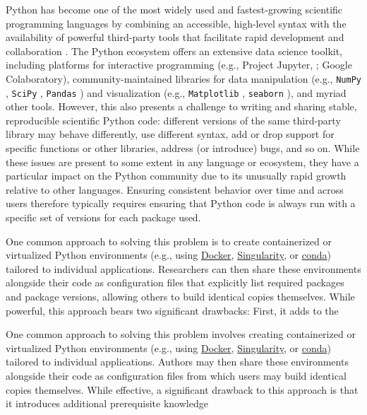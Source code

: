 \documentclass[preprint,12pt, a4paper]{elsarticle}
\begin{document}
Python has become one of the most widely used and fastest-growing scientific programming languages by combining an accessible, high-level syntax with the availability of powerful third-party tools that facilitate rapid development and collaboration \cite{MullEtal15}. The Python ecosystem offers an extensive data science toolkit, including platforms for interactive programming (e.g., Project Jupyter, \cite{KluyEtal16}; Google Colaboratory), community-maintained libraries for data manipulation (e.g., \texttt{NumPy} \cite{HarrEtal20}, \texttt{SciPy} \cite{VirtEtal20}, \texttt{Pandas} \cite{McKi10}) and visualization (e.g., \texttt{Matplotlib} \cite{Hunt07}, \texttt{seaborn} \cite{Wask21}), and myriad other tools. However, this also presents a challenge to writing and sharing stable, reproducible scientific Python code: different versions of the same third-party library may behave differently, use different syntax, add or drop support for specific functions or other libraries, address (or introduce) bugs, and so on. While these issues are present to some extent in any language or ecosystem, they have a particular impact on the Python community due to its unusually rapid growth relative to other languages. Ensuring consistent behavior over time and across users therefore typically requires ensuring that Python code is always run with a specific set of versions for each package used. 

One common approach to solving this problem is to create containerized or virtualized Python environments (e.g., using \href{https://www.docker.com/}{Docker}, \href{https://sylabs.io/singularity/}{Singularity}, or \href{https://docs.conda.io/en/latest/}{conda}) tailored to individual applications. Researchers can then share these environments alongside their code as configuration files that explicitly list required packages and package versions, allowing others to build identical copies themselves. While powerful, this approach bears two significant drawbacks: First, it adds to the 

One common approach to solving this problem involves creating containerized or virtualized Python environments (e.g., using \href{https://www.docker.com/}{Docker}, \href{https://sylabs.io/singularity/}{Singularity}, or \href{https://docs.conda.io/en/latest/}{conda}) tailored to individual applications. Authors may then share these environments alongside their code as configuration files from which users may build identical copies themselves. While effective, a significant drawback to this approach is that it introduces additional prerequisite knowledge  
\end{document}
